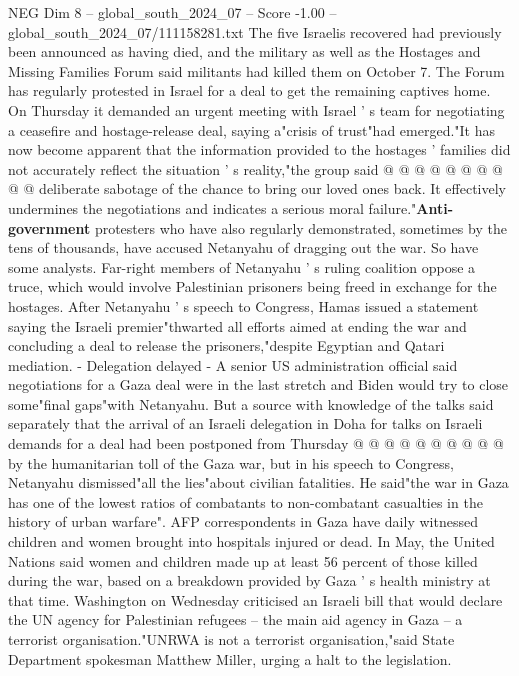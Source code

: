 \begin{textsample}{NEG Dim 8 – global\_south\_2024\_07 – Score -1.00 – global\_south\_2024\_07/111158281.txt}
The five Israelis recovered had previously been announced as having died, and the military as well as the Hostages and Missing Families Forum said militants had killed them on October 7.
The Forum has regularly protested in Israel for a deal to get the remaining captives home.
On Thursday it demanded an urgent meeting with Israel ' s team for negotiating a ceasefire and hostage-release deal, saying a"crisis of trust"had emerged."It has now become apparent that the information provided to the hostages ' families did not accurately reflect the situation ' s reality,"the group said @ @ @ @ @ @ @ @ @ @ deliberate sabotage of the chance to bring our loved ones back.
It effectively undermines the negotiations and indicates a serious moral failure."\textbf{Anti-government} protesters who have also regularly demonstrated, sometimes by the tens of thousands, have accused Netanyahu of dragging out the war.
So have some analysts.
Far-right members of Netanyahu ' s ruling coalition oppose a truce, which would involve Palestinian prisoners being freed in exchange for the hostages.
After Netanyahu ' s speech to Congress, Hamas issued a statement saying the Israeli premier"thwarted all efforts aimed at ending the war and concluding a deal to release the prisoners,"despite Egyptian and Qatari mediation. - Delegation delayed - A senior US administration official said negotiations for a Gaza deal were in the last stretch and Biden would try to close some"final gaps"with Netanyahu.
But a source with knowledge of the talks said separately that the arrival of an Israeli delegation in Doha for talks on Israeli demands for a deal had been postponed from Thursday @ @ @ @ @ @ @ @ @ @ by the humanitarian toll of the Gaza war, but in his speech to Congress, Netanyahu dismissed"all the lies"about civilian fatalities.
He said"the war in Gaza has one of the lowest ratios of combatants to non-combatant casualties in the history of urban warfare".
AFP correspondents in Gaza have daily witnessed children and women brought into hospitals injured or dead.
In May, the United Nations said women and children made up at least 56 percent of those killed during the war, based on a breakdown provided by Gaza ' s health ministry at that time.
Washington on Wednesday criticised an Israeli bill that would declare the UN agency for Palestinian refugees -- the main aid agency in Gaza -- a terrorist organisation."UNRWA is not a terrorist organisation,"said State Department spokesman Matthew Miller, urging a halt to the legislation.

\end{textsample}
